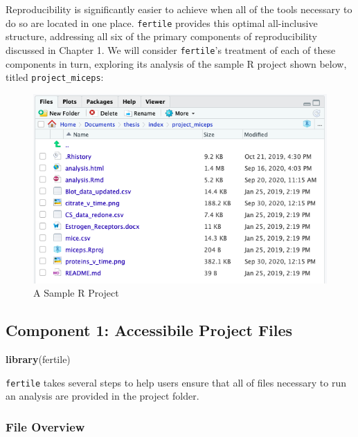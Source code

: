\documentclass[12pt,twoside]{reedthesis}
\newenvironment{Shaded}{\begin{snugshade}}{\end{snugshade}}
\newcommand{\KeywordTok}[1]{\textcolor[rgb]{0.13,0.29,0.53}{\textbf{#1}}}
\newcommand{\NormalTok}[1]{#1}
\begin{document}
Reproducibility is significantly easier to achieve when all of the tools necessary to do so are located in one place. \texttt{fertile} provides this optimal all-inclusive structure, addressing all six of the primary components of reproducibility discussed in Chapter 1. We will consider \texttt{fertile}'s treatment of each of these components in turn, exploring its analysis of the sample R project shown below, titled \texttt{project\_miceps}:
\begin{figure}
\includegraphics[width=1\linewidth]{figure/sample-project} \caption{A Sample R Project}\label{fig:unnamed-chunk-9}
\end{figure}
\hypertarget{component-1-accessibile-project-files}{%
\subsection{Component 1: Accessibile Project Files}\label{component-1-accessibile-project-files}}
\begin{Shaded}
\begin{Highlighting}[]
\KeywordTok{library}\NormalTok{(fertile)}
\end{Highlighting}
\end{Shaded}
\texttt{fertile} takes several steps to help users ensure that all of files necessary to run an analysis are provided in the project folder.

\hypertarget{file-overview}{%
\subsubsection{File Overview}\label{file-overview}}
\end{document}
